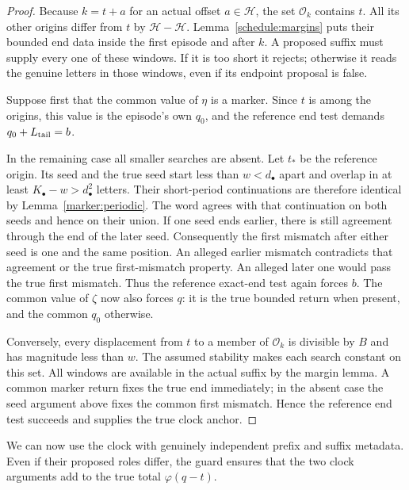 \begin{proof}
Because $k=t+a$ for an actual offset $a\in\mathcal H$, the set
$\mathcal O_k$ contains $t$. All its other origins differ from $t$ by
$\mathcal H-\mathcal H$. Lemma~\ref{schedule:margins} puts their
bounded end data inside the first episode and after $k$. A proposed
suffix must supply every one of these windows. If it is too short it
rejects; otherwise it reads the genuine letters in those windows, even
if its endpoint proposal is false.

Suppose first that the common value of $\eta$ is a marker. Since $t$
is among the origins, this value is the episode's own $q_0$, and the
reference end test demands $q_0+L_{\rm tail}=b$.

In the remaining case all smaller searches are absent. Let $t_*$ be the
reference origin. Its seed and the true seed start less than
$w<d_\bullet$ apart and overlap in at least
$K_\bullet-w>d_\bullet^2$ letters. Their short-period continuations are
therefore identical by Lemma~\ref{marker:periodic}. The word agrees
with that continuation on both seeds and hence on their union. If one
seed ends earlier, there is still agreement through the end of the later
seed. Consequently the first mismatch after either seed is one and the
same position. An alleged earlier mismatch contradicts that agreement
or the true first-mismatch property. An alleged later one would pass the
true first mismatch. Thus the reference exact-end test again forces $b$.
The common value of $\zeta$ now also forces $q$: it is the true bounded
return when present, and the common $q_0$ otherwise.

Conversely, every displacement from $t$ to a member of $\mathcal O_k$
is divisible by $B$ and has magnitude less than $w$. The assumed
stability makes each search constant on this set. All windows are
available in the actual suffix by the margin lemma. A common marker
return fixes the true end immediately; in the absent case the seed
argument above fixes the common first mismatch. Hence the reference
end test succeeds and supplies the true clock anchor.
\end{proof}

We can now use the clock with genuinely independent prefix and suffix
metadata.  Even if their proposed roles differ, the guard ensures that
the two clock arguments add to the true total $\varphi(q-t)$.
